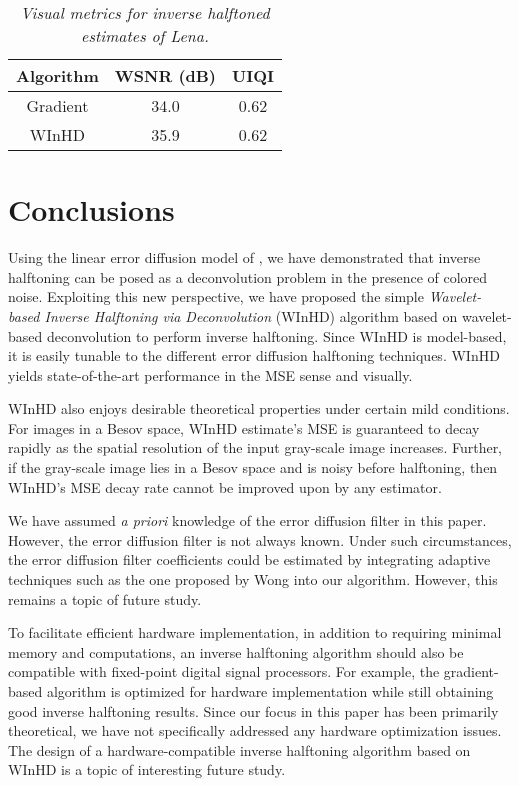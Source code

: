 \documentclass[11pt]{article}
\begin{document}
\begin{table}[tb]
\begin{center}
\caption{ \small \sl {Visual metrics for inverse halftoned estimates of Lena.}}
\vspace*{2mm}
\begin{tabular}{|c|c|c|}
\hline 
Algorithm& WSNR (dB)&  UIQI \\
\hline
Gradient \cite{gradient_halftoning} & 34.0 & 0.62\\
\hline
\mbox{WInHD} & 35.9 & 0.62\\\hline
\end{tabular}
\label{visual}
\end{center}
\end{table}




\section{Conclusions}
\label{Conclusions}
\sloppy


Using the linear error diffusion model of \cite{Kite,KiteJournal}, we
have demonstrated that inverse halftoning can be posed as a
deconvolution problem in the presence of colored noise. Exploiting
this new perspective, we have proposed the simple {\em Wavelet-based Inverse
Halftoning via Deconvolution} (\mbox{WInHD}) 
algorithm based on wavelet-based deconvolution to perform inverse
halftoning. Since \mbox{WInHD} is model-based, it is easily tunable to
the different error diffusion halftoning techniques. \mbox{WInHD}
yields state-of-the-art performance in the MSE sense and visually.

\mbox{WInHD} also enjoys desirable theoretical properties under
certain mild conditions.  For images in a Besov space, \mbox{WInHD}
estimate's MSE is guaranteed to decay rapidly as the spatial
resolution of the input gray-scale image increases. Further, if the
gray-scale image lies in a Besov space and is noisy before halftoning,
then \mbox{WInHD}'s MSE decay rate cannot be improved upon by any
estimator.

We have assumed {\em a priori} knowledge of the error diffusion filter in
this paper. However, the error diffusion filter is not always
known. Under such circumstances, the error diffusion filter
coefficients could be estimated by integrating adaptive techniques
such as the one proposed by Wong \cite{kernelestimation} into our
algorithm. However, this remains a topic of future study.


To facilitate efficient hardware implementation, in addition to
requiring minimal memory and computations, an inverse halftoning
algorithm should also be compatible with fixed-point digital signal
processors. For example, the gradient-based algorithm
\cite{gradient_halftoning} is optimized for hardware implementation
while still obtaining good inverse halftoning results. Since our focus
in this paper has been primarily theoretical, we have not specifically
addressed any hardware optimization issues. The design of a
hardware-compatible inverse halftoning algorithm based on \mbox{WInHD}
is a topic of interesting future study.
\end{document}
